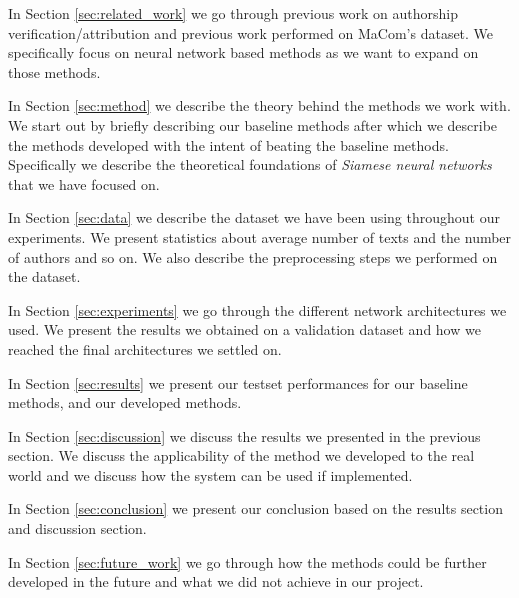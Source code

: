 In Section \ref{sec:related_work} we go through previous work on authorship
verification/attribution and previous work performed on MaCom's dataset. We
specifically focus on neural network based methods as we want to expand on those
methods.

In Section \ref{sec:method} we describe the theory behind the methods we work
with. We start out by briefly describing our baseline methods after which
we describe the methods developed with the intent of beating the baseline
methods. Specifically we describe the theoretical foundations of \textit{Siamese
neural networks} that we have focused on.

In Section \ref{sec:data} we describe the dataset we have been using throughout
our experiments. We present statistics about average number of texts and the
number of authors and so on. We also describe the preprocessing steps we
performed on the dataset.

In Section \ref{sec:experiments} we go through the different network
architectures we used. We present the results we obtained on a validation
dataset and how we reached the final architectures we settled on.

In Section \ref{sec:results} we present our testset performances for our
baseline methods, and our developed methods.

In Section \ref{sec:discussion} we discuss the results we presented in the
previous section. We discuss the applicability of the method we developed to the
real world and we discuss how the system can be used if implemented.

In Section \ref{sec:conclusion} we present our conclusion based on the results
section and discussion section.

In Section \ref{sec:future_work} we go through how the methods could be further
developed in the future and what we did not achieve in our project.
